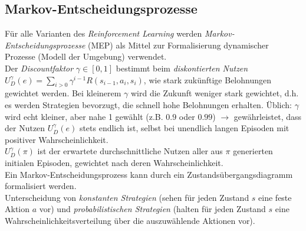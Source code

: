 \subsection{Markov-Entscheidungsprozesse}
\label{markov}
Für alle Varianten des \emph{Reinforcement Learning} werden \emph{Markov-Entscheidungsprozesse} (MEP) als Mittel zur Formalisierung dynamischer Prozesse (Modell der Umgebung) verwendet.\\

Der \emph{Discountfaktor} $\gamma\in [0,1]$ bestimmt beim \emph{diskontierten Nutzen} $U_D^\gamma(e)=\sum_{i>0}\gamma^{i-1}R(s_{i-1}, a_i, s_i)$, wie stark zukünftige Belohnungen gewichtet werden. Bei kleinerem $\gamma$ wird die Zukunft weniger stark gewichtet, d.h. es werden Strategien bevorzugt, die schnell hohe Belohnungen erhalten. Üblich: $\gamma$ wird echt kleiner, aber nahe 1 gewählt (z.B. $0.9$ oder $0.99$) $\rightarrow$ gewährleistet, dass der Nutzen $U_D^\gamma(e)$ stets endlich ist, selbst bei unendlich langen Episoden mit positiver Wahrscheinlichkeit.\\

$U_D^\gamma(\pi)$ ist der erwartete durchschnittliche Nutzen aller aus $\pi$ generierten initialen Episoden, gewichtet nach deren Wahrscheinlichkeit.\\

Ein Markov-Entscheidungsprozess kann durch ein Zustandsübergangsdiagramm formalisiert werden.\\

Unterscheidung von \emph{konstanten Strategien} (sehen für jeden Zustand $s$ eine feste Aktion $a$ vor) und \emph{probabilistischen Strategien} (halten für jeden Zustand $s$ eine Wahrscheinlichkeitsverteilung über die auszuwählende Aktionen vor).\\